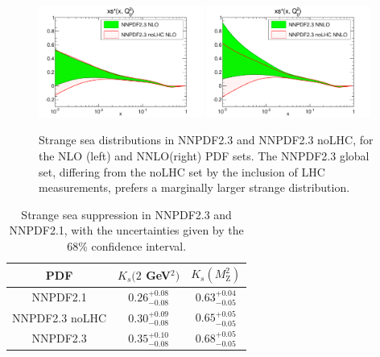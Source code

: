 \begin{figure}[h!]
\centering
\includegraphics[width=0.48\textwidth]{6-LHCimpact/figs/xsp_Q_2_log-23-vs-23noLHC-nlo.pdf}
\includegraphics[width=0.48\textwidth]{6-LHCimpact/figs/xsp_Q_2_log-23-vs-23noLHC-nnlo.pdf}
\caption[Strange sea distributions in NNPDF2.3 and NNPDF2.3 noLHC]{Strange sea distributions in NNPDF2.3 and NNPDF2.3 noLHC, for the NLO (left) and NNLO(right) PDF sets. The NNPDF2.3 global set, differing from the noLHC set by the inclusion of LHC measurements, prefers a marginally larger strange distribution.}
\label{fig:23noLHCvs23_strangeness}
\end{figure}
\clearpage

\begin{table}[htb]
\begin{center}
\begin{tabular}{|c|c|c|}
\hline
PDF	& $K_s(2$ GeV$^2)$ & $K_s(M_{\text{Z}}^2)$ \\
\hline
NNPDF2.1 & $0.26^{+0.08}_{-0.08}$ & $0.63^{+0.04}_{-0.05}$ \\
NNPDF2.3 noLHC & $0.30^{+0.09}_{-0.08}$ & $0.65^{+0.05}_{-0.05}$ \\
NNPDF2.3 & $0.35^{+0.10}_{-0.08}$ & $0.68^{+0.05}_{-0.05}$ \\
\hline
\end{tabular}
\caption[Strange sea suppression in NNPDF2.3 and NNPDF2.1 NNLO]{Strange sea suppression in NNPDF2.3 and NNPDF2.1, with the uncertainties given by the 68\% confidence interval. }
\label{tab:strangesupp}
\end{center}
\end{table}%

